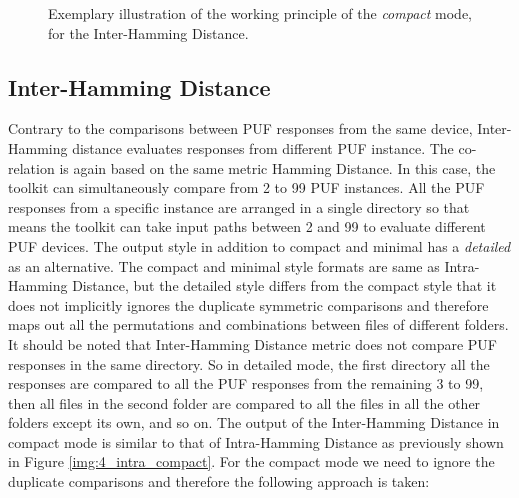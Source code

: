 \begin{figure}
\centering
{}
\caption{Exemplary illustration of the working principle of the \emph{compact} mode, for the Inter-Hamming Distance.}
\label{img:inter_compact}
\end{figure}

\subsection{Inter-Hamming Distance}
\label{inter_hd_section}
Contrary to the comparisons between PUF responses from the same device, Inter-Hamming distance evaluates responses from different PUF instance. The co-relation is again based on the same metric Hamming Distance. In this case, the toolkit can simultaneously compare from 2 to 99 PUF instances. All the PUF responses from a specific instance are arranged in a single directory so that means the toolkit can take input paths between 2 and 99 to evaluate different PUF devices. The output
style in addition to compact and minimal has a \emph{detailed} as an alternative. The compact and minimal style formats are same as Intra-Hamming Distance, but the detailed style differs from the compact style that it does not implicitly ignores the duplicate symmetric comparisons and therefore maps out all the permutations and combinations between files of different folders. It should be noted that Inter-Hamming Distance metric does not compare PUF responses in the same directory. So
in detailed mode, the first directory all the responses are compared to all the PUF responses from the remaining 3 to 99, then all files in the second folder are compared to all the files in all the other folders except its own, and so on. The output of the Inter-Hamming Distance in compact mode is similar to that of Intra-Hamming Distance as previously shown in Figure \ref{img:4_intra_compact}. For the compact mode we need to ignore the duplicate comparisons and therefore the following approach is
taken:

